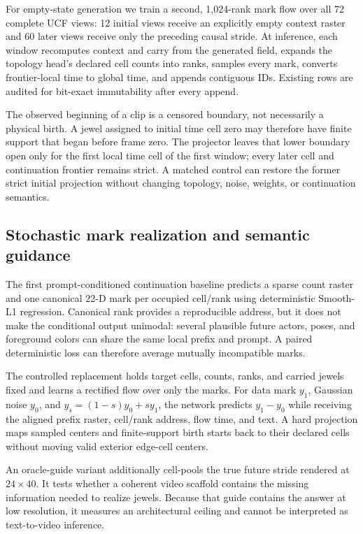 \documentclass[10pt]{article}
\begin{document}
For empty-state generation we train a second, 1,024-rank mark flow over all 72 complete UCF views:
12 initial views receive an explicitly empty context raster and 60 later views receive only the
preceding causal stride. At inference, each window recomputes context and carry from the generated
field, expands the topology head's declared cell counts into ranks, samples every mark, converts
frontier-local time to global time, and appends contiguous IDs. Existing rows are audited for
bit-exact immutability after every append.

The observed beginning of a clip is a censored boundary, not necessarily a physical birth. A jewel
assigned to initial time cell zero may therefore have finite support that began before frame zero.
The projector leaves that lower boundary open only for the first local time cell of the first
window; every later cell and continuation frontier remains strict. A matched control can restore
the former strict initial projection without changing topology, noise, weights, or continuation
semantics.

\subsection{Stochastic mark realization and semantic guidance}

The first prompt-conditioned continuation baseline predicts a sparse count raster and one canonical
22-D mark per occupied cell/rank using deterministic Smooth-L1 regression. Canonical rank provides
a reproducible address, but it does not make the conditional output unimodal: several plausible
future actors, poses, and foreground colors can share the same local prefix and prompt. A paired
deterministic loss can therefore average mutually incompatible marks.

The controlled replacement holds target cells, counts, ranks, and carried jewels fixed and learns a
rectified flow over only the marks. For data mark \(y_1\), Gaussian noise \(y_0\), and
\(y_s=(1-s)y_0+sy_1\), the network predicts \(y_1-y_0\) while receiving the aligned prefix raster,
cell/rank address, flow time, and text. A hard projection maps sampled centers and finite-support
birth starts back to their declared cells without moving valid exterior edge-cell centers.

An oracle-guide variant additionally cell-pools the true future stride rendered at
\(24\times40\). It tests whether a coherent video scaffold contains the missing information needed
to realize jewels. Because that guide contains the answer at low resolution, it measures an
architectural ceiling and cannot be interpreted as text-to-video inference.
\end{document}
